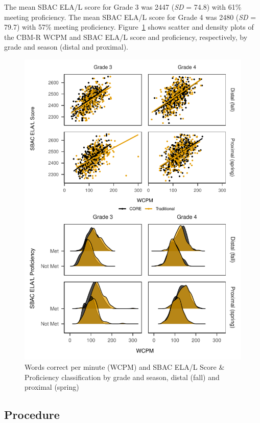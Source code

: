 \documentclass[
  english,
  man, fleqn, noextraspace]{apa6}
\begin{document}
The mean SBAC ELA/L score for Grade 3 was 2447 (\emph{SD} = 74.8) with 61\% meeting proficiency. The mean SBAC ELA/L score for Grade 4 was 2480 (\emph{SD} = 79.7) with 57\% meeting proficiency. Figure~\ref{fig:fig-sbac-scatter} shows scatter and density plots of the CBM-R WCPM and SBAC ELA/L score and proficiency, respectively, by grade and season (distal and proximal).



\begin{figure}
\centering
\includegraphics{conseq_validity_manusript_files/figure-latex/fig-sbac-scatter-1.pdf}
\caption{\label{fig:fig-sbac-scatter}Words correct per minute (WCPM) and SBAC ELA/L Score \& Proficiency classification by grade and season, distal (fall) and proximal (spring)}
\end{figure}

\hypertarget{procedure}{%
\subsection{Procedure}\label{procedure}}
\end{document}
